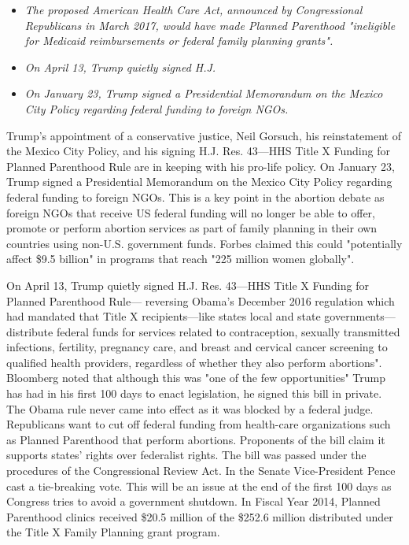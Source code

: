 \begin{itemize}
\item
  \emph{The proposed American Health Care Act, announced by
  Congressional Republicans in March 2017, would have made Planned
  Parenthood "ineligible for Medicaid reimbursements or federal family
  planning grants".}
\item
  \emph{On April 13, Trump quietly signed H.J.}
\item
  \emph{On January 23, Trump signed a Presidential Memorandum on the
  Mexico City Policy regarding federal funding to foreign NGOs.}
\end{itemize}

Trump's appointment of a conservative justice, Neil Gorsuch, his
reinstatement of the Mexico City Policy, and his signing H.J. Res.
43---HHS Title X Funding for Planned Parenthood Rule are in keeping with
his pro-life policy. On January 23, Trump signed a Presidential
Memorandum on the Mexico City Policy regarding federal funding to
foreign NGOs. This is a key point in the abortion debate as foreign NGOs
that receive US federal funding will no longer be able to offer, promote
or perform abortion services as part of family planning in their own
countries using non-U.S. government funds. Forbes claimed this could
"potentially affect \$9.5 billion" in programs that reach "225 million
women globally".

On April 13, Trump quietly signed H.J. Res. 43---HHS Title X Funding for
Planned Parenthood Rule--- reversing Obama's December 2016 regulation
which had mandated that Title X recipients---like states local and state
governments---distribute federal funds for services related to
contraception, sexually transmitted infections, fertility, pregnancy
care, and breast and cervical cancer screening to qualified health
providers, regardless of whether they also perform abortions". Bloomberg
noted that although this was "one of the few opportunities" Trump has
had in his first 100 days to enact legislation, he signed this bill in
private. The Obama rule never came into effect as it was blocked by a
federal judge. Republicans want to cut off federal funding from
health-care organizations such as Planned Parenthood that perform
abortions. Proponents of the bill claim it supports states' rights over
federalist rights. The bill was passed under the procedures of the
Congressional Review Act. In the Senate Vice-President Pence cast a
tie-breaking vote. This will be an issue at the end of the first 100
days as Congress tries to avoid a government shutdown. In Fiscal Year
2014, Planned Parenthood clinics received \$20.5 million of the \$252.6
million distributed under the Title X Family Planning grant program.

